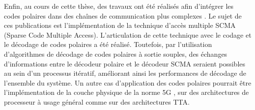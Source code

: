 Enfin, au cours de cette thèse, des travaux ont été réalisés afin d'intégrer les codes polaires dans des chaînes de communication plus complexes . Le sujet de ces publications est l'implémentation de la technique d'accès multiple SCMA (Sparse Code Multiple Access). L'articulation de cette technique avec le codage et le décodage de codes polaires a été réalisé. Toutefois, par l'utilisation d'algorithmes de décodage de codes polaires à sortie souples, des échanges d'informations entre le décodeur polaire et le décodeur SCMA seraient possibles au sein d'un processus itératif, améliorant ainsi les performances de décodage de l'ensemble du système. Un autre cas d'application des codes polaires pourrait être l'implémentation de la couche physique de la norme 5G \cite{3gpp_ts_2017}, sur des architectures de processeur à usage général comme sur des architectures TTA.
